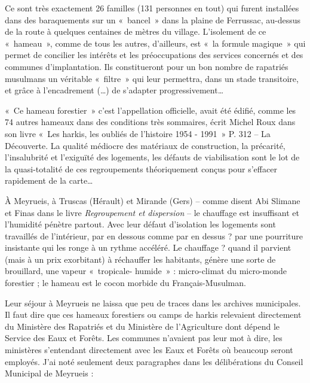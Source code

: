 
Ce sont très exactement 26 familles (131 personnes en tout) qui furent installées dans
des baraquements sur un «~bancel~» dans la plaine de Ferrussac, au-dessus de la route
à quelques centaines de mètres du village. L’isolement de ce «~hameau~», comme de
tous les autres, d’ailleurs, est «~la formule magique~» qui permet de concilier les
intérêts et les préoccupations des services concernés et des communes d’implantation.
Ils constitueront pour un bon nombre de rapatriés musulmans un véritable «~filtre~»
qui leur permettra, dans un stade transitoire, et grâce à l’encadrement (…) de
s’adapter progressivement…



«~Ce hameau forestier~» c’est l’appellation officielle, avait été édifié, comme les 74
autres hameaux dans des conditions très sommaires, écrit Michel Roux dans son livre
«~Les harkis, les oubliés de l’histoire 1954 - 1991~» P. 312 -- La Découverte. La qualité médiocre
des matériaux de construction, la précarité, l’insalubrité et l’exiguïté des logements,
les défauts de viabilisation sont le lot de la quasi-totalité de ces regroupements
théoriquement conçus pour s’effacer rapidement de la carte…

À Meyrueis, à Truscas (Hérault) et Mirande (Gers) -- comme disent Abi Slimane et Finas
dans le livre \textit{Regroupement et dispersion} -- le chauffage est insuffisant et l’humidité pénètre partout. Avec leur défaut d’isolation les logements sont travaillés de l’intérieur, par
en dessous comme par en dessus ? par une pourriture insistante qui les ronge à un
rythme accéléré. Le chauffage ? quand il parvient (mais à un prix exorbitant) à
réchauffer les habitants, génère une sorte de brouillard, une vapeur «~tropicale-
humide~» : micro-climat du micro-monde forestier ; le hameau est le cocon morbide
du Français-Musulman.

Leur séjour à Meyrueis ne laissa que peu de traces dans les archives municipales. Il
faut dire que ces hameaux forestiers ou camps de harkis relevaient directement du
Ministère des Rapatriés et du Ministère de l’Agriculture dont dépend le Service des
Eaux et Forêts. Les communes n’avaient pas leur mot à dire, les ministères
s’entendant directement avec les Eaux et Forêts où beaucoup seront employés. J’ai
noté seulement deux paragraphes dans les délibérations du Conseil Municipal de
Meyrueis :


